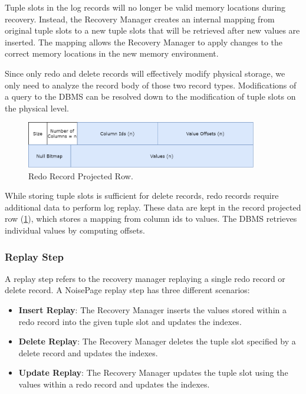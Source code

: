 \documentclass[12pt]{cmuthesis}
\begin{document}
Tuple slots in the log records will no longer be valid memory locations during recovery. Instead, the Recovery Manager creates an internal mapping from original tuple slots to a new tuple slots that will be retrieved after new values are inserted. The mapping allows the Recovery Manager to apply changes to the correct memory locations in the new memory environment.

Since only redo and delete records will effectively modify physical storage, we only need to analyze the record body of those two record types. Modifications of a query to the DBMS can be resolved down to the modification of tuple slots on the physical level.

\begin{figure}[t!]
\centering
\includegraphics[width=0.9\textwidth]{images/Delta.png}
\caption{Redo Record Projected Row.}
\label{fig:projected_row}
\end{figure}

 While storing tuple slots is sufficient for delete records, redo records require additional data to perform log replay. These data are kept in the record projected row (\cref{fig:projected_row}), which stores a mapping from column ids to values. The DBMS retrieves individual values by computing offsets.

\subsubsection{Replay Step}
A replay step refers to the recovery manager replaying a single redo record or delete record. A NoisePage replay step has three different scenarios:
\begin{itemize}
    \item \textbf{Insert Replay}: The Recovery Manager inserts the values stored within a redo record into the given tuple slot and updates the indexes.
    \item \textbf{Delete Replay}: The Recovery Manager deletes the tuple slot specified by a delete record and updates the indexes.
    \item \textbf{Update Replay}: The Recovery Manager updates the tuple slot using the values within a redo record and updates the indexes.
\end{itemize}
\end{document}
